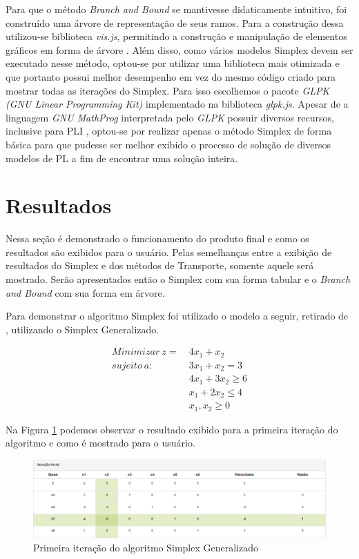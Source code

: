 \documentclass [11pt]{articleSBPO}
\begin{document}
Para que o método \textit{Branch and Bound} se mantivesse didaticamente intuitivo, foi construído uma árvore de representação de seus ramos. Para a construção dessa utilizou-se biblioteca \textit{vis.js}, permitindo a construção e manipulação de elementos gráficos em forma de árvore \cite{vis}. Além disso, como vários modelos Simplex devem ser executado nesse método, optou-se por utilizar uma biblioteca mais otimizada e que portanto possui melhor desempenho em vez do mesmo código criado para mostrar todas as iterações do Simplex. Para isso escolhemos o pacote \textit{GLPK (GNU Linear Programming Kit)} implementado na biblioteca \textit{glpk.js}. Apesar de a linguagem \textit{GNU MathProg} interpretada pelo \textit{GLPK} possuir diversos recursos, inclusive para PLI \cite{mathprog}, optou-se por realizar apenas o método Simplex de forma básica para que pudesse ser melhor exibido o processo de solução de diversos modelos de PL a fim de encontrar uma solução inteira.

\section{Resultados}\label{sec:resultados}

Nessa seção é demonstrado o funcionamento do produto final e como os resultados são exibidos para o usuário. Pelas semelhanças entre a exibição de resultados do Simplex e dos métodos de Transporte, somente aquele será mostrado. Serão apresentados então o Simplex com sua forma tabular e o \textit{Branch and Bound} com sua forma em árvore.

Para demonstrar o algoritmo Simplex foi utilizado o modelo a seguir, retirado de \cite{taha}, utilizando o Simplex Generalizado.

\begin{equation*}
	\begin{split}
		Minimizar\ z =\ & 4x_{1} + x_{2} \\
		sujeito\ a:\ \ \ \ &  3x_{1} + x_{2} = 3 \\
		& 4x_{1} + 3x_{2} \geq 6 \\
		& x_{1} + 2x_{2} \leq 4 \\
		& x_{1}, x_{2} \geq 0
	\end{split}
\end{equation*}

Na Figura \ref{fig:simplexit1} podemos observar o resultado exibido para a primeira iteração do algoritmo e como é mostrado para o usuário.

\begin{figure}[!h]
	\centering
	\includegraphics[width=1\textwidth]{img/simplexit1.png}
	\caption[]{Primeira iteração do algoritmo Simplex Generalizado}
	\label{fig:simplexit1}
\end{figure}
\end{document}
